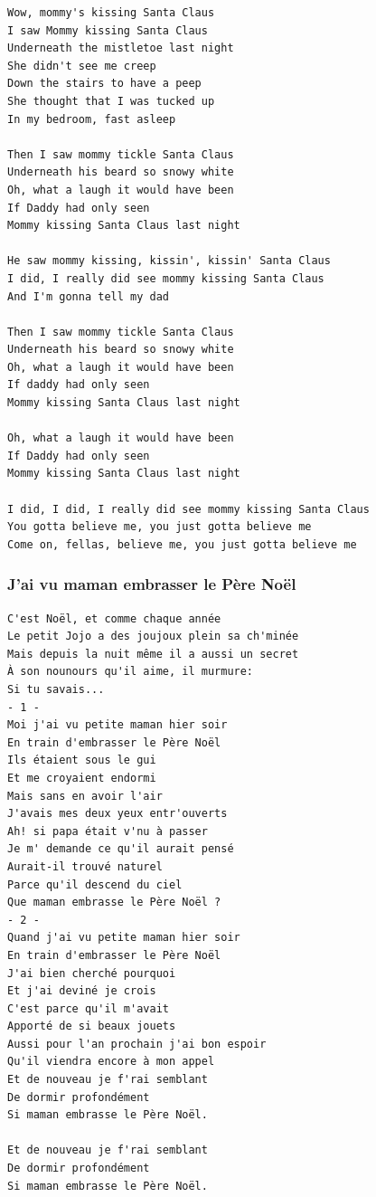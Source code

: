 \documentclass[
]{article}
\begin{document}
\begin{verbatim}
Wow, mommy's kissing Santa Claus
I saw Mommy kissing Santa Claus
Underneath the mistletoe last night
She didn't see me creep
Down the stairs to have a peep
She thought that I was tucked up
In my bedroom, fast asleep

Then I saw mommy tickle Santa Claus
Underneath his beard so snowy white
Oh, what a laugh it would have been
If Daddy had only seen
Mommy kissing Santa Claus last night

He saw mommy kissing, kissin', kissin' Santa Claus
I did, I really did see mommy kissing Santa Claus
And I'm gonna tell my dad

Then I saw mommy tickle Santa Claus
Underneath his beard so snowy white
Oh, what a laugh it would have been
If daddy had only seen
Mommy kissing Santa Claus last night

Oh, what a laugh it would have been
If Daddy had only seen
Mommy kissing Santa Claus last night

I did, I did, I really did see mommy kissing Santa Claus
You gotta believe me, you just gotta believe me
Come on, fellas, believe me, you just gotta believe me
\end{verbatim}

\hypertarget{jai-vu-maman-embrasser-le-puxe8re-nouxebl}{%
\subsubsection*{J'ai vu maman embrasser le Père
Noël}\label{jai-vu-maman-embrasser-le-puxe8re-nouxebl}}

\begin{verbatim}
C'est Noël, et comme chaque année
Le petit Jojo a des joujoux plein sa ch'minée
Mais depuis la nuit même il a aussi un secret
À son nounours qu'il aime, il murmure: 
Si tu savais...
- 1 -
Moi j'ai vu petite maman hier soir
En train d'embrasser le Père Noël
Ils étaient sous le gui
Et me croyaient endormi
Mais sans en avoir l'air
J'avais mes deux yeux entr'ouverts
Ah! si papa était v'nu à passer
Je m' demande ce qu'il aurait pensé
Aurait-il trouvé naturel
Parce qu'il descend du ciel
Que maman embrasse le Père Noël ?
- 2 -
Quand j'ai vu petite maman hier soir
En train d'embrasser le Père Noël
J'ai bien cherché pourquoi
Et j'ai deviné je crois
C'est parce qu'il m'avait
Apporté de si beaux jouets
Aussi pour l'an prochain j'ai bon espoir
Qu'il viendra encore à mon appel
Et de nouveau je f'rai semblant
De dormir profondément
Si maman embrasse le Père Noël.

Et de nouveau je f'rai semblant
De dormir profondément
Si maman embrasse le Père Noël.
\end{verbatim}
\end{document}
